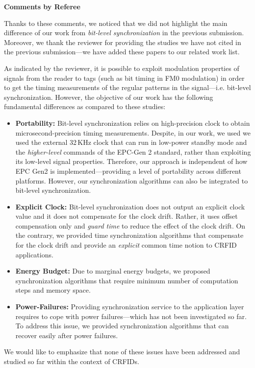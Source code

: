 \documentclass[10pt]{article}
\newcommand{\response}[1]{{\color{blue} #1}}
\newcounter{refereeCounter}
\newenvironment{responses}{%
\refstepcounter{refereeCounter}%
\textbf{\large Comments by Referee \therefereeCounter}
\begin{enumerate}%
\renewcommand{\labelenumi}{\textbf{[R\therefereeCounter :\,\arabic{enumi}]}} %
}{\end{enumerate}}
\begin{document}
\begin{responses}
\response{
Thanks to these comments, we noticed that we did not highlight the main difference of our work from \emph{bit-level synchronization} in the previous submission. Moreover, we thank the reviewer for providing the studies we have not cited in the previous submission---we have added these papers to our related work list.

As indicated by the reviewer, it is possible to exploit modulation properties of signals from the reader to tags (such as bit timing in FM0 modulation) in order to get the timing measurements of the regular patterns in the signal---i.e. bit-level synchronization. However, the objective of our work has the following fundamental differences as compared to these studies:
\begin{itemize}
	\item \textbf{Portability:} Bit-level synchronization relies on high-precision clock to obtain microsecond-precision timing measurements. Despite, in our work, we used we used the external 32\,KHz clock that can run in low-power standby mode and the \emph{higher-level} commands of the EPC-Gen 2 standard, rather than exploiting its low-level signal properties. Therefore, our approach is independent of how EPC Gen2 is implemented---providing a level of portability across different platforms. However, our synchronization algorithms can also be integrated to bit-level synchronization.
	\item \textbf{Explicit Clock:} Bit-level synchronization does not output an explicit clock value and it does not compensate for the clock drift. Rather, it uses offset compensation only and \emph{guard time} to reduce the effect of the clock drift. On the contrary, we provided time synchronization algorithms that compensate for the clock drift and provide an \emph{explicit} common time notion to CRFID applications.
	\item \textbf{Energy Budget:} Due to marginal energy budgets, we proposed synchronization algorithms that require minimum number of computation steps and memory space.
	\item \textbf{Power-Failures:} Providing synchronization service to the application layer requires to cope with power failures---which has not been investigated so far. To address this issue, we provided synchronization algorithms that can recover easily after power failures.
\end{itemize}

We would like to emphasize that none of these issues have been addressed and studied so far within the context of CRFIDs.
}


\end{responses}
\end{document}

